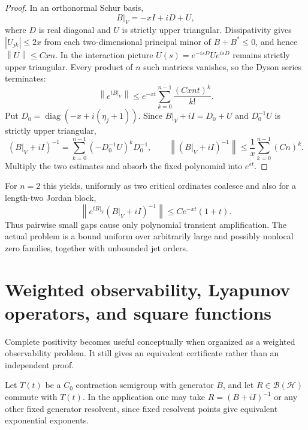 \documentclass[11pt]{amsart}
\theoremstyle{definition}
\theoremstyle{remark}
\newcommand{\Bcal}{\mathcal B}
\newcommand{\Hcal}{\mathcal H}
\newcommand{\eps}{\varepsilon}
\newcommand{\norm}[1]{\left\lVert #1\right\rVert}
\newcommand{\abs}[1]{\left\lvert #1\right\rvert}
\begin{document}
\begin{proof}
In an orthonormal Schur basis,
\[
 B|_V=-xI+iD+U,
\]
where $D$ is real diagonal and $U$ is strictly upper triangular.
Dissipativity gives $\abs{U_{jk}}\leq2x$ from each two-dimensional principal
minor of $B+B^*\leq0$, and hence $\norm U\leq Cxn$.  In the interaction
picture $U(s)=e^{-isD}Ue^{isD}$ remains strictly upper triangular.  Every
product of $n$ such matrices vanishes, so the Dyson series terminates:
\[
\norm{e^{tB|_V}}
 \leq e^{-xt}\sum_{k=0}^{n-1}\frac{(Cxn t)^k}{k!}.
\]
Put $D_0=\operatorname{diag}(-x+i(\eta_j+1))$.  Since
$B|_V+iI=D_0+U$ and $D_0^{-1}U$ is strictly upper triangular,
\[
 (B|_V+iI)^{-1}
 =\sum_{k=0}^{n-1}(-D_0^{-1}U)^kD_0^{-1},
 \qquad
 \norm{(B|_V+iI)^{-1}}
 \leq\frac1x\sum_{k=0}^{n-1}(Cn)^k.
\]
Multiply the two estimates and absorb the fixed polynomial into
$e^{\eps t}$.
\end{proof}

For $n=2$ this yields, uniformly as two critical ordinates coalesce and also
for a length-two Jordan block,
\[
 \norm{e^{tB|_V}(B|_V+iI)^{-1}}
 \leq C e^{-xt}(1+t).
\]
Thus pairwise small gaps cause only polynomial transient amplification.  The
actual problem is a bound uniform over arbitrarily large and possibly
nonlocal zero families, together with unbounded jet orders.

\section{Weighted observability, Lyapunov operators, and square functions}
\label{sec:Lyapunov}

Complete positivity becomes useful conceptually when organized as a weighted
observability problem.  It still gives an equivalent certificate rather than
an independent proof.

Let $T(t)$ be a $C_0$ contraction semigroup with generator $B$, and let
$R\in\Bcal(\Hcal)$ commute with $T(t)$.  In the application one may take
$R=(B+iI)^{-1}$ or any other fixed generator resolvent, since fixed resolvent
points give equivalent exponential exponents.
\end{document}
